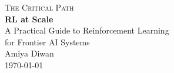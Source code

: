 \documentclass[11pt, letterpaper]{book}
\begin{document}
\begin{titlepage}
\centering
\vspace*{3cm}
{\large\scshape The Critical Path}\\[0.4cm]
{\Huge\bfseries RL at Scale}\\[0.8cm]
{\Large A Practical Guide to Reinforcement Learning\\for Frontier AI Systems}\\[2cm]
{\large Amiya Diwan}\\[1cm]
{\today}
\vfill
\end{titlepage}

\tableofcontents
\newpage







\end{document}
